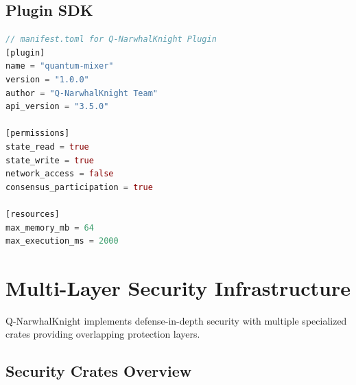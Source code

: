 \documentclass[12pt,a4paper]{article}
\begin{document}
\subsection{Plugin SDK}

\begin{lstlisting}[language=Rust, caption={Plugin Manifest Example}]
// manifest.toml for Q-NarwhalKnight Plugin
[plugin]
name = "quantum-mixer"
version = "1.0.0"
author = "Q-NarwhalKnight Team"
api_version = "3.5.0"

[permissions]
state_read = true
state_write = true
network_access = false
consensus_participation = true

[resources]
max_memory_mb = 64
max_execution_ms = 2000
\end{lstlisting}

\section{Multi-Layer Security Infrastructure}

Q-NarwhalKnight implements defense-in-depth security with multiple specialized crates providing overlapping protection layers.

\subsection{Security Crates Overview}

\begin{center}
\end{center}
\end{document}
